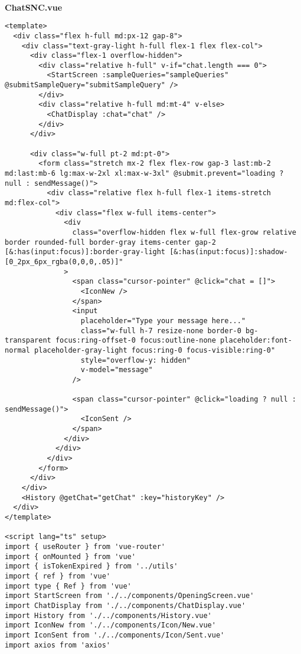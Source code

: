 \
\\
\textbf{ChatSNC.vue}

\begin{Verbatim}[breaklines=true, breakanywhere=true]
<template>
  <div class="flex h-full md:px-12 gap-8">
    <div class="text-gray-light h-full flex-1 flex flex-col">
      <div class="flex-1 overflow-hidden">
        <div class="relative h-full" v-if="chat.length === 0">
          <StartScreen :sampleQueries="sampleQueries" @submitSampleQuery="submitSampleQuery" />
        </div>
        <div class="relative h-full md:mt-4" v-else>
          <ChatDisplay :chat="chat" />
        </div>
      </div>

      <div class="w-full pt-2 md:pt-0">
        <form class="stretch mx-2 flex flex-row gap-3 last:mb-2 md:last:mb-6 lg:max-w-2xl xl:max-w-3xl" @submit.prevent="loading ? null : sendMessage()">
          <div class="relative flex h-full flex-1 items-stretch md:flex-col">
            <div class="flex w-full items-center">
              <div
                class="overflow-hidden flex w-full flex-grow relative border rounded-full border-gray items-center gap-2 [&:has(input:focus)]:border-gray-light [&:has(input:focus)]:shadow-[0_2px_6px_rgba(0,0,0,.05)]"
              >
                <span class="cursor-pointer" @click="chat = []">
                  <IconNew />
                </span>
                <input
                  placeholder="Type your message here..."
                  class="w-full h-7 resize-none border-0 bg-transparent focus:ring-offset-0 focus:outline-none placeholder:font-normal placeholder-gray-light focus:ring-0 focus-visible:ring-0"
                  style="overflow-y: hidden"
                  v-model="message"
                />

                <span class="cursor-pointer" @click="loading ? null : sendMessage()">
                  <IconSent />
                </span>
              </div>
            </div>
          </div>
        </form>
      </div>
    </div>
    <History @getChat="getChat" :key="historyKey" />
  </div>
</template>

<script lang="ts" setup>
import { useRouter } from 'vue-router'
import { onMounted } from 'vue'
import { isTokenExpired } from '../utils'
import { ref } from 'vue'
import type { Ref } from 'vue'
import StartScreen from './../components/OpeningScreen.vue'
import ChatDisplay from './../components/ChatDisplay.vue'
import History from './../components/History.vue'
import IconNew from './../components/Icon/New.vue'
import IconSent from './../components/Icon/Sent.vue'
import axios from 'axios'


\end{Verbatim}
